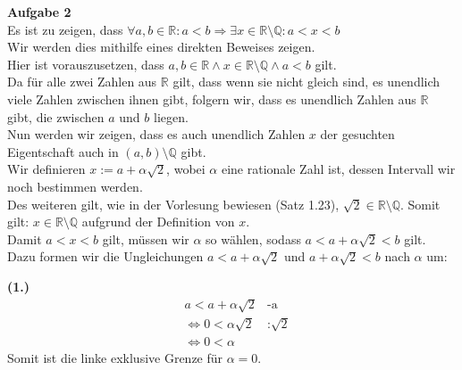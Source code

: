 \documentclass[12pt, a4paper]{article}
\begin{document}
\textbf{Aufgabe 2} \\
Es ist zu zeigen, dass $\forall a,b \in \mathbb R: a < b \Rightarrow \exists x \in \mathbb R \setminus \mathbb Q : a < x < b$\\
Wir werden dies mithilfe eines direkten Beweises zeigen. \\
Hier ist vorauszusetzen, dass $a,b \in \mathbb R \wedge x \in \mathbb R \setminus \mathbb Q \wedge a < b$ gilt. \\
Da für alle zwei Zahlen aus $\mathbb R$ gilt, dass wenn sie nicht gleich sind, es unendlich viele Zahlen zwischen ihnen gibt, folgern wir, dass es unendlich Zahlen aus $\mathbb R$ gibt, die zwischen $a$ und $b$ liegen. \\
Nun werden wir zeigen, dass es auch unendlich Zahlen $x$ der gesuchten Eigentschaft auch in $(a,b) \setminus \mathbb Q$ gibt. \\
Wir definieren $x := a + \alpha \sqrt{2}$, wobei $\alpha$ eine rationale Zahl ist, dessen Intervall wir noch bestimmen werden.\\
Des weiteren gilt, wie in der Vorlesung bewiesen (Satz 1.23), $\sqrt{2} \in \mathbb R \setminus \mathbb Q$. Somit gilt: $x \in \mathbb R \setminus \mathbb Q$ aufgrund der Definition von $x$. \\
Damit $a < x < b$ gilt, müssen wir $\alpha$ so wählen, sodass $a < a + \alpha \sqrt{2} < b$ gilt. \\
Dazu formen wir die Ungleichungen $a < a + \alpha \sqrt{2}$ und $a + \alpha \sqrt{2} < b$ nach $\alpha$ um:

\textbf{(1.)}
\vspace{-1cm}
\begin{align*}
	& a < a + \alpha \sqrt{2} & \text{-a}\\
	& \Longleftrightarrow 0 < \alpha \sqrt{2} & \text{:$\sqrt{2}$}\\
	& \Longleftrightarrow 0 < \alpha
\end{align*}
\hspace{-0.15cm}
Somit ist die linke exklusive Grenze für $\alpha = 0$.\\
\\\\\\
\end{document}

